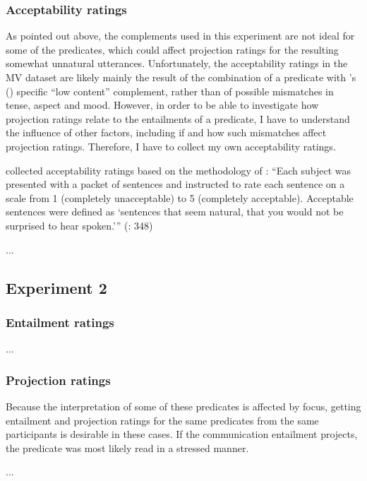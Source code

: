 \documentclass[11pt,fleqn]{article}
\newcommand{\6}{\mbox{$[\hspace*{-.6mm}[$}}
\newcommand{\9}{\mbox{$]\hspace*{-.6mm}]$}}
\newcommand{\citepos}[1]{\citeauthor{#1}'s (\citeyear{#1})}
\begin{document}
\subsubsection{Acceptability ratings}
As pointed out above, the complements used in this experiment are not ideal for some of the predicates, which could affect projection ratings for the resulting somewhat unnatural utterances. Unfortunately, the acceptability ratings in the MV dataset are likely mainly the result of the combination of a predicate with \citepos{white-rawlins-nels2018} specific “low content” complement, rather than of possible mismatches in tense, aspect and mood. However, in order to be able to investigate how projection ratings relate to the entailments of a predicate, I have to understand the influence of other factors, including if and how such mismatches affect projection ratings. Therefore, I have to collect my own acceptability ratings. 

\cite{white-rawlins-nels2018} collected acceptability ratings based on the methodology of \cite{fisher1991}: ``Each subject was presented with a packet of sentences and instructed to rate each sentence on a scale from 1 (completely unacceptable) to 5 (completely acceptable). Acceptable sentences were defined as ‘sentences that seem natural, that you would not be surprised to hear spoken.’” (\citealt{fisher1991}: 348)

...

\subsection{Experiment 2}
\subsubsection{Entailment ratings}

...

\subsubsection{Projection ratings}

Because the interpretation of some of these predicates is affected by focus, getting entailment and projection ratings for the same predicates from the same participants is desirable in these cases. If the communication entailment projects, the predicate was most likely read in a stressed manner.

...


\pagebreak



\end{document}
